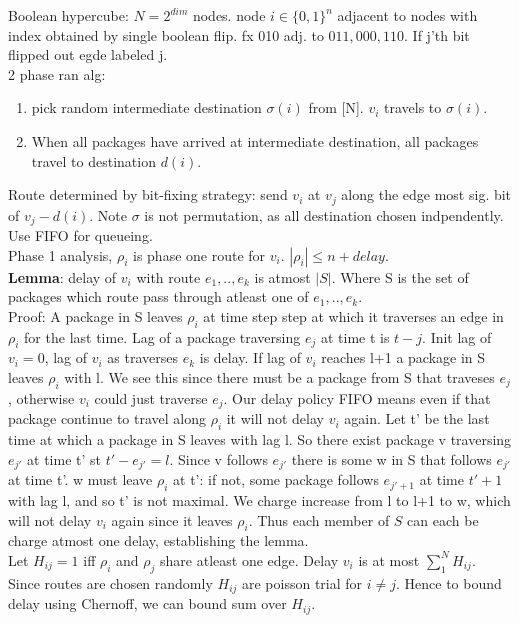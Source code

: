 \documentclass[a4paper]{article}
\begin{document}
Boolean hypercube: \(N=2^{dim}\) nodes. node \(i \in \{0,1\}^n\) adjacent to nodes with index obtained by single boolean flip. fx 010 adj. to \(011,000,110\). If j'th bit flipped out egde labeled j.\\
2 phase ran alg:
\begin{enumerate}
\item pick random intermediate destination \(\sigma(i)\) from [N]. \(v_i\) travels to \(\sigma(i)\).
\item When all packages have arrived at intermediate destination, all packages travel to destination \(d(i)\).
\end{enumerate}
Route determined by bit-fixing strategy: send \(v_i\) at \(v_j\) along the edge most sig. bit of \(v_j - d(i)\). Note \(\sigma\) is not permutation, as all destination chosen indpendently. Use FIFO for queueing.\\
Phase 1 analysis, \(\rho_i\) is phase one route for \(v_i\). \(|\rho_i| \leq n+delay\).\\
\textbf{Lemma}: delay of \(v_i\) with route \(e_1,..,e_k\) is atmost \(|S|\). Where S is the set of packages which route pass through atleast one of \(e_1,..,e_k\).\\
Proof: A package in S leaves \(\rho_i\) at time step step at which it traverses an edge in \(\rho_i\) for the last time. Lag of a package traversing \(e_j\) at time t is \(t-j\). Init lag of \(v_i=0\), lag of \(v_i\) as traverses \(e_k\) is delay. If lag of \(v_i\) reaches l+1 a package in S leaves \(\rho_i\) with l. We see this since there must be a package from S that traveses \(e_j\), otherwise \(v_i\) could just traverse \(e_j\). Our delay policy FIFO means even if that package continue to travel along \(\rho_i\) it will not delay \(v_i\) again.  Let t' be the last time at which a package in S leaves with lag l. So there exist package v traversing \(e_{j'}\) at time t' st \(t'-e_{j'} = l\). Since v follows \(e_{j'}\) there is some w in S that follows \(e_{j'}\) at time t'. w must leave \(\rho_i\) at t': if not, some package follows \(e_{j'+1}\) at time \(t'+1\) with lag l, and so t' is not maximal. We charge increase from l to l+1 to w, which will not delay \(v_i\) again since it leaves \(\rho_i\). Thus each member of \(S\) can each be charge atmost one delay, establishing the lemma.\\
Let \(H_{ij}=1\) iff \(\rho_i\) and \(\rho_j\) share atleast one edge. Delay \(v_i\) is at most \(\sum_1^N H_{ij}\). Since routes are chosen randomly \(H_{ij}\) are poisson trial for \(i\neq j\). Hence to bound delay using Chernoff, we can bound sum over \(H_{ij}\).\\
\end{document}
